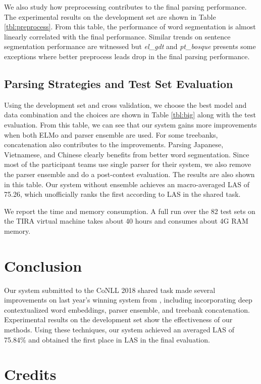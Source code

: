 \documentclass[11pt,a4paper]{article}
\begin{document}
We also study how preprocessing contributes to the final parsing performance.
The experimental results on the development set are shown in Table \ref{tbl:preprocess}.
From this table, the performance of word segmentation
is almost linearly correlated with the final performance.
Similar trends on sentence segmentation performance are witnessed
but \textit{el\_gdt} and \textit{pt\_bosque} presents some exceptions
where better preprocess leads drop in the final parsing performance.

\subsection{Parsing Strategies and Test Set Evaluation}
Using the development set and cross validation,
we choose the best model and data combination and
the choices are shown in Table \ref{tbl:big}
along with the test evaluation.
From this table, we can see that our system gains more improvements
when both ELMo and parser ensemble are used.
For some treebanks, concatenation also contributes to the improvements.
Parsing Japanese, Vietnamese, and Chinese clearly benefits from better word segmentation.
Since most of the participant teams use single parser
for their system, we also remove the parser ensemble and do a post-contest evaluation.
The results are also shown in this table.
Our system without ensemble achieves an macro-averaged LAS
of 75.26, which unofficially ranks the first according to LAS in the shared task.

We report the time and memory consumption.
A full run over the 82 test sets on the TIRA virtual machine \cite{tira}
takes about 40 hours and consumes about 4G RAM memory.

\section{Conclusion}

Our system submitted to the CoNLL 2018 shared task made several improvements
on last year's winning system from \citet{dozat-qi-manning:2017:K17-3},
including incorporating deep contextualized word embeddings,
parser ensemble, and treebank concatenation.
Experimental results on the development set show the effectiveness of our methods.
Using  these techniques, our system achieved an averaged LAS of 75.84\%
and obtained the first place in LAS in the final evaluation.

\section{Credits}
\end{document}
